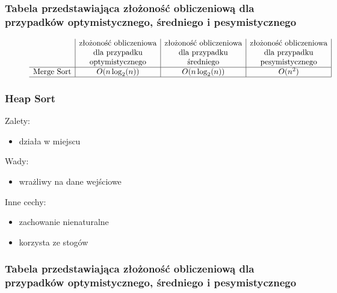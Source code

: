 \documentclass[polish,polish,a4paper]{article}
\begin{document}
\begin{spacing}{1.5}
	\subsubsection*{Tabela przedstawiająca złożoność obliczeniową dla przypadków optymistycznego, średniego i pesymistycznego} 
	\begin{figure}[H]
		
		\begin{equation*}
		\begin{array}{l|c|c|c|}

		&$złożoność obliczeniowa$&$złożoność obliczeniowa$&$złożoność obliczeniowa$\\
		&$dla przypadku$&$dla przypadku$&$dla przypadku$\\
		&$optymistycznego$&$średniego$&$pesymistycznego$\\
		\hline
		$Merge Sort$&O(n\log_{2}(n))&O(n\log_{2}(n))&O(n^2)\\
		\hline
		\end{array}
		\end{equation*}
	\end{figure}
	
			\subsubsection*{Heap Sort}
Zalety:
\begin{itemize}
	\item działa w miejscu
\end{itemize}
Wady:
\begin{itemize}
	\item wrażliwy na dane wejściowe
\end{itemize}
Inne cechy:
\begin{itemize}
	\item zachowanie nienaturalne
	\item korzysta ze stogów
\end{itemize}

\subsubsection*{Tabela przedstawiająca złożoność obliczeniową dla przypadków optymistycznego, średniego i pesymistycznego} 
\begin{figure}[H]
	
	\begin{equation*}
	\begin{array}{l|c|c|c|}


\end{array}
\end{equation*}
\end{figure}
\end{spacing}
\end{document}
